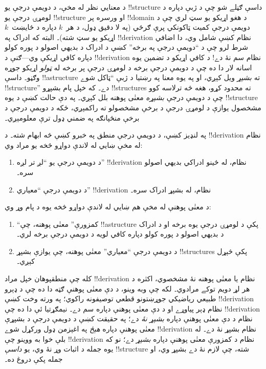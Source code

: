 \documentclass[../../../include/open-logic-section]{subfiles}
\begin{document}
د معنايي نظر له مخې، د دويمې درجې يو !!{structure} داسې ګڼلے شو چې
د ژبې دپاره د لومړۍ درجې يو !!{structure} او ورسره پر !!{domain} د
هغو اړيکو يو سټ لري چې د دويمې درجې کميت ټاکونکي پرې ګرځي (په لا
دقيق ډول، د هر~$k$ دپاره د ځايښت~$k$ اړيکو يو سټ شته)۔ البته که
ادراک په !!{derivation} نظام کښې شامل وي، دا اضافي شرط لرو چې د
``دويمې درجې په برخه'' کښې د ادراک د بديهي اصولو د پوره کولو دپاره
کافي اړيکې وي---ګنې د !!{derivation} نظام سم نۀ دے!{} د کافي اړيکو د
تضمين يوه اسانه لار دا ده چې د دويمې درجې برخه د لومړۍ درجې پر برخه
له \emph{ټولو} اړيکو جوړه وګڼو۔ داسې !!a{structure} ته \emph{بشپړ}
ويل کېږي، او په يوه معنا په رښتيا د ژبې ``ټاکل شوے !!{structure}''
دے۔ که خپل پام بشپړو !!{structure}s ته محدود کړو، هغه څه ترلاسه کوو
چې د دويمې درجې \emph{بشپړه} معنٰی پوهنه بلل کېږي۔ په دې حالت کښې د
يوه !!{structure} مشخصول يوازې د لومړۍ درجې د برخې مشخصولو ته راکمېږي،
ځکه د دويمې درجې د برخې منځپانګه په ضمني ډول ترې معلومېږي۔

په لنډيز کښې، د دويمې درجې منطق په خبرو کښې څه ابهام شته۔ د
!!{derivation} نظام له مخې ښايي له لاندې دواړو څخه يو مراد وي:
\begin{enumerate}
\item د دويمې درجې يو ``لږ تر لږه'' !!{derivation} نظام، له ځينو
  ادراکي بديهي اصولو سره۔
\item د دويمې درجې ``معياري'' !!{derivation} نظام، له بشپړ ادراک سره۔
\end{enumerate}
د معنٰی پوهنې له مخې هم ښايي له لاندې دواړو څخه يوه د پام وړ وي:
\begin{enumerate}
\item ``کمزورې'' معنٰی پوهنه، چې !!a{structure} پکې د لومړۍ درجې يوه
  برخه او د ادراک د بديهي اصولو د پوره کولو دپاره کافي لويه د دويمې
  درجې برخه لري۔
\item د دويمې درجې ``معياري'' معنٰی پوهنه، چې يوازې بشپړ
  !!{structure}s پکې څېړل کېږي۔
\end{enumerate}
کله چې منطقپوهان خپل مراد !!{derivation} نظام يا معنٰی پوهنه نۀ
مشخصوي، اکثره د هر لړ دويم توکے مرادوي۔ لکه چې وبه وينو، د دې معنٰی
پوهنې ګټه دا ده چې د ډېرو طبيعي رياضيکي جوړښتونو قطعي توصيفونه راکوي؛
په ورته وخت کښې !!{derivation} نظام ډېر پياوړے او د دې معنٰی پوهنې
دپاره سم دے۔ نيمګړتيا ئې دا ده چې !!{derivation} نظام د دې معنٰی
پوهنې دپاره \emph{بشپړ نۀ} دے؛ په حقيقت کښې د دويمې درجې د بشپړې
معنٰی پوهنې دپاره \emph{هېڅ} په اغېزمن ډول ورکړل شوے !!{derivation}
نظام بشپړ نۀ دے۔ له بلې خوا به ووينو چې !!{derivation} نظام د کمزورې
معنٰی پوهنې دپاره \emph{بشپړ} دے؛ نو که يوه جمله د اثبات وړ نۀ وي،
يو \emph{داسې} !!{structure} شته، چې لازم نۀ دے بشپړ وي، او جمله پکې
دروغ ده۔
\end{document}
